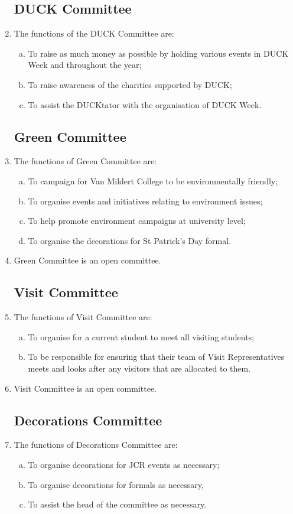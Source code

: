 \documentclass[12pt]{article}
\begin{document}
\begin{enumerate}
    \subsection{DUCK Committee}
    \item The functions of the DUCK Committee are:
    \begin{enumerate}[(a)]
        \item To raise as much money as possible by holding various events in DUCK Week and throughout the year;
        \item To raise awareness of the charities supported by DUCK;
        \item To assist the DUCKtator with the organisation of DUCK Week.
    \end{enumerate}
    \subsection{Green Committee}
    \item The functions of Green Committee are:
    \begin{enumerate}[(a)]
        \item To campaign for Van Mildert College to be environmentally friendly;
        \item To organise events and initiatives relating to environment issues;
        \item To help promote environment campaigns at university level;
        \item To organise the decorations for St Patrick’s Day formal.
    \end{enumerate}
    \item Green Committee is an open committee.
    \subsection{Visit Committee}
    \item The functions of Visit Committee are:
    \begin{enumerate}[(a)]
        \item To organise for a current student to meet all visiting students;
        \item To be responsible for ensuring that their team of Visit Representatives meets and looks after any visitors that are allocated to them.
    \end{enumerate}
    \item Visit Committee is an open committee.
    \subsection{Decorations Committee}
    \item The functions of Decorations Committee are:
    \begin{enumerate}[(a)]
        \item To organise decorations for JCR events as necessary;
        \item To organise decorations for formals as necessary,
        \item To assist the head of the committee as necessary.
    \end{enumerate}

\end{enumerate}
\end{document}
